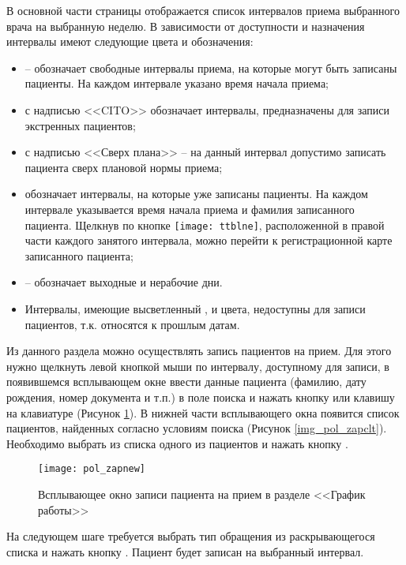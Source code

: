 В основной части страницы отображается список интервалов приема выбранного врача на выбранную неделю. В зависимости от доступности и назначения интервалы имеют следующие цвета и обозначения:
\begin{itemize}
 \item {} -- обозначает свободные интервалы приема, на которые могут быть записаны пациенты. На каждом интервале указано время начала приема;
 \item {} с надписью <<CITO>> обозначает интервалы, предназначены для записи экстренных пациентов;
 \item {} с надписью <<Сверх плана>> -- на данный интервал допустимо записать пациента сверх плановой нормы приема;
 \item {} обозначает интервалы, на которые уже записаны пациенты. На каждом интервале указывается время начала приема и фамилия записанного пациента. Щелкнув по кнопке \texttt{[image: ttblne]}, расположенной в правой части каждого занятого интервала, можно перейти к регистрационной карте записанного пациента;
 \item {} -- обозначает выходные и нерабочие дни.
 \item Интервалы, имеющие высветленный ,  и  цвета, недоступны для записи пациентов, т.к. относятся к прошлым датам.
\end{itemize}

Из данного раздела можно осуществлять запись пациентов на прием. Для этого нужно щелкнуть левой кнопкой мыши по интервалу, доступному для записи, в появившемся всплывающем окне ввести данные пациента (фамилию, дату рождения, номер документа и т.п.) в поле поиска и нажать кнопку  или клавишу  на клавиатуре (Рисунок \ref{img_pol_zapnew}). В нижней части всплывающего окна появится список пациентов, найденных согласно условиям поиска (Рисунок \ref{img_pol_zapclt}). Необходимо выбрать из списка одного из пациентов и нажать кнопку .   

\begin{figure}[ht]\centering
 \texttt{[image: pol\_zapnew]}
 \caption{Всплывающее окно записи пациента на прием в разделе <<График работы>>}
 \label{img_pol_zapnew}
\end{figure}

На следующем шаге требуется выбрать тип обращения из раскрывающегося списка и нажать кнопку . Пациент будет записан на выбранный интервал. 

